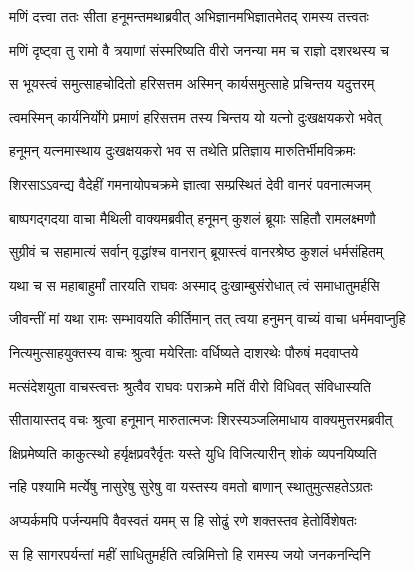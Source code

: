 
\twolineshloka
{मणिं दत्त्वा ततः सीता हनूमन्तमथाब्रवीत्}
{अभिज्ञानमभिज्ञातमेतद् रामस्य तत्त्वतः} %

\twolineshloka
{मणिं दृष्ट्वा तु रामो वै त्रयाणां संस्मरिष्यति}
{वीरो जनन्या मम च राज्ञो दशरथस्य च} %

\twolineshloka
{स भूयस्त्वं समुत्साहचोदितो हरिसत्तम}
{अस्मिन् कार्यसमुत्साहे प्रचिन्तय यदुत्तरम्} %

\twolineshloka
{त्वमस्मिन् कार्यनिर्योगे प्रमाणं हरिसत्तम}
{तस्य चिन्तय यो यत्नो दुःखक्षयकरो भवेत्} %

\twolineshloka
{हनूमन् यत्नमास्थाय दुःखक्षयकरो भव}
{स तथेति प्रतिज्ञाय मारुतिर्भीमविक्रमः} %

\twolineshloka
{शिरसाऽऽवन्द्य वैदेहीं गमनायोपचक्रमे}
{ज्ञात्वा सम्प्रस्थितं देवी वानरं पवनात्मजम्} %

\twolineshloka
{बाष्पगद्गदया वाचा मैथिली वाक्यमब्रवीत्}
{हनूमन् कुशलं ब्रूयाः सहितौ रामलक्ष्मणौ} %

\twolineshloka
{सुग्रीवं च सहामात्यं सर्वान् वृद्धांश्च वानरान्}
{ब्रूयास्त्वं वानरश्रेष्ठ कुशलं धर्मसंहितम्} %

\twolineshloka
{यथा च स महाबाहुर्मां तारयति राघवः}
{अस्माद् दुःखाम्बुसंरोधात् त्वं समाधातुमर्हसि} %

\twolineshloka
{जीवन्तीं मां यथा रामः सम्भावयति कीर्तिमान्}
{तत् त्वया हनुमन् वाच्यं वाचा धर्ममवाप्नुहि} %

\twolineshloka
{नित्यमुत्साहयुक्तस्य वाचः श्रुत्वा मयेरिताः}
{वर्धिष्यते दाशरथेः पौरुषं मदवाप्तये} %

\twolineshloka
{मत्संदेशयुता वाचस्त्वत्तः श्रुत्वैव राघवः}
{पराक्रमे मतिं वीरो विधिवत् संविधास्यति} %

\twolineshloka
{सीतायास्तद् वचः श्रुत्वा हनूमान् मारुतात्मजः}
{शिरस्यञ्जलिमाधाय वाक्यमुत्तरमब्रवीत्} %

\twolineshloka
{क्षिप्रमेष्यति काकुत्स्थो हर्यृक्षप्रवरैर्वृतः}
{यस्ते युधि विजित्यारीन् शोकं व्यपनयिष्यति} %

\twolineshloka
{नहि पश्यामि मर्त्येषु नासुरेषु सुरेषु वा}
{यस्तस्य वमतो बाणान् स्थातुमुत्सहतेऽग्रतः} %

\twolineshloka
{अप्यर्कमपि पर्जन्यमपि वैवस्वतं यमम्}
{स हि सोढुं रणे शक्तस्तव हेतोर्विशेषतः} %

\twolineshloka
{स हि सागरपर्यन्तां महीं साधितुमर्हति}
{त्वन्निमित्तो हि रामस्य जयो जनकनन्दिनि} %

